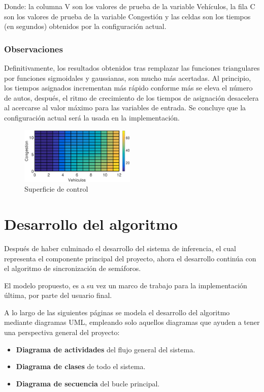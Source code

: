 Donde: la columna V son los valores de prueba de la variable Vehículos, la fila C son los valores de  prueba de la variable Congestión y las celdas son los tiempos (en segundos) obtenidos por la configuración actual.

\subsubsection{Observaciones}

\begin{multicols}{2}
	Definitivamente, los resultados obtenidos tras remplazar las funciones triangulares por funciones sigmoidales y gaussianas, son mucho más acertadas. Al principio, los tiempos asignados incrementan más rápido conforme más se eleva el número de autos, después, el ritmo de crecimiento de los tiempos de asignación desacelera al acercarse al valor máximo para las variables de entrada. Se concluye que la configuración actual será la usada en la implementación.
	\begin{figure}[H]
	\includegraphics[width=0.49\textwidth]{Surfaces/Surface2D_D.eps}
	\caption{Superficie de control}
\end{figure}
\end{multicols}
\pagebreak

\section{Desarrollo del algoritmo}\label{section:desarrolloAlgoritmo}
Después de haber culminado el desarrollo del sistema de inferencia, el cual representa el componente principal del proyecto, ahora el desarrollo continúa con el algoritmo de sincronización de semáforos.

El modelo propuesto, es a su vez un marco de trabajo para la implementación última, por parte del usuario final.

A lo largo de las siguientes páginas se modela el desarrollo del algoritmo mediante diagramas UML, empleando solo aquellos diagramas que ayuden a tener una perspectiva general del proyecto:
\begin{itemize}
	\item \textbf{Diagrama de actividades} del flujo general del sistema.
	\item \textbf{Diagrama de clases} de todo el sistema.
	\item \textbf{Diagrama de secuencia} del bucle principal.
\end{itemize}

